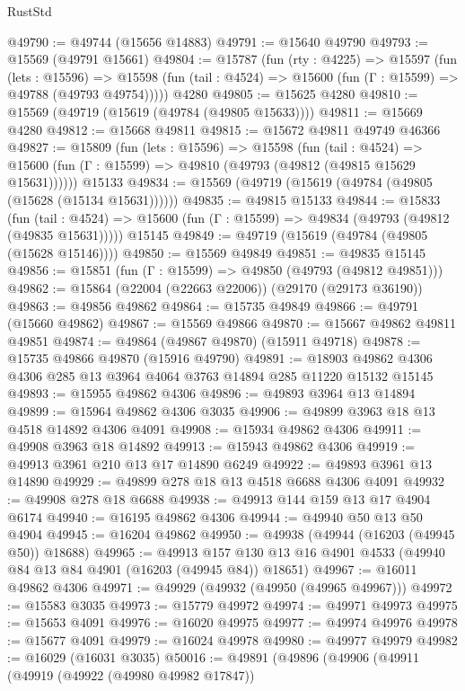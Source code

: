 \begin{lexlean}{RustStd}
\begin{coremodule}
@49790 := @49744 (@15656 @14883)
@49791 := @15640 @49790
@49793 := @15569 (@49791 @15661)
@49804 := @15787
    (fun (rty : @4225) =>
    @15597
      (fun (lets : @15596) =>
      @15598 (fun (tail : @4524) => @15600 (fun (Γ : @15599) => @49788 (@49793 @49754)))))
    @4280
@49805 := @15625 @4280
@49810 := @15569 (@49719 (@15619 (@49784 (@49805 @15633))))
@49811 := @15669 @4280
@49812 := @15668 @49811
@49815 := @15672 @49811 @49749 @46366
@49827 := @15809
    (fun (lets : @15596) =>
    @15598
      (fun (tail : @4524) =>
      @15600 (fun (Γ : @15599) => @49810 (@49793 (@49812 (@49815 @15629 @15631))))))
    @15133
@49834 := @15569 (@49719 (@15619 (@49784 (@49805 (@15628 (@15134 @15631))))))
@49835 := @49815 @15133
@49844 := @15833
    (fun (tail : @4524) => @15600 (fun (Γ : @15599) => @49834 (@49793 (@49812 (@49835 @15631)))))
    @15145
@49849 := @49719 (@15619 (@49784 (@49805 (@15628 @15146))))
@49850 := @15569 @49849
@49851 := @49835 @15145
@49856 := @15851 (fun (Γ : @15599) => @49850 (@49793 (@49812 @49851)))
@49862 := @15864 (@22004 (@22663 @22006)) (@29170 (@29173 @36190))
@49863 := @49856 @49862
@49864 := @15735 @49849
@49866 := @49791 (@15660 @49862)
@49867 := @15569 @49866
@49870 := @15667 @49862 @49811 @49851
@49874 := @49864 (@49867 @49870) (@15911 @49718)
@49878 := @15735 @49866 @49870 (@15916 @49790)
@49891 := @18903 @49862 @4306 @4306 @285 @13 @3964 @4064 @3763 @14894 @285 @11220 @15132 @15145
@49893 := @15955 @49862 @4306
@49896 := @49893 @3964 @13 @14894
@49899 := @15964 @49862 @4306 @3035
@49906 := @49899 @3963 @18 @13 @4518 @14892 @4306 @4091
@49908 := @15934 @49862 @4306
@49911 := @49908 @3963 @18 @14892
@49913 := @15943 @49862 @4306
@49919 := @49913 @3961 @210 @13 @17 @14890 @6249
@49922 := @49893 @3961 @13 @14890
@49929 := @49899 @278 @18 @13 @4518 @6688 @4306 @4091
@49932 := @49908 @278 @18 @6688
@49938 := @49913 @144 @159 @13 @17 @4904 @6174
@49940 := @16195 @49862 @4306
@49944 := @49940 @50 @13 @50 @4904
@49945 := @16204 @49862
@49950 := @49938 (@49944 (@16203 (@49945 @50)) @18688)
@49965 := @49913
    @157
    @130
    @13
    @16
    @4901
    @4533
    (@49940 @84 @13 @84 @4901 (@16203 (@49945 @84)) @18651)
@49967 := @16011 @49862 @4306
@49971 := @49929 (@49932 (@49950 (@49965 @49967)))
@49972 := @15583 @3035
@49973 := @15779 @49972
@49974 := @49971 @49973
@49975 := @15653 @4091
@49976 := @16020 @49975
@49977 := @49974 @49976
@49978 := @15677 @4091
@49979 := @16024 @49978
@49980 := @49977 @49979
@49982 := @16029 (@16031 @3035)
@50016 := @49891
    (@49896
      (@49906
        (@49911
          (@49919
            (@49922 (@49980 @49982 @17847))

\end{coremodule}
\end{lexlean}
